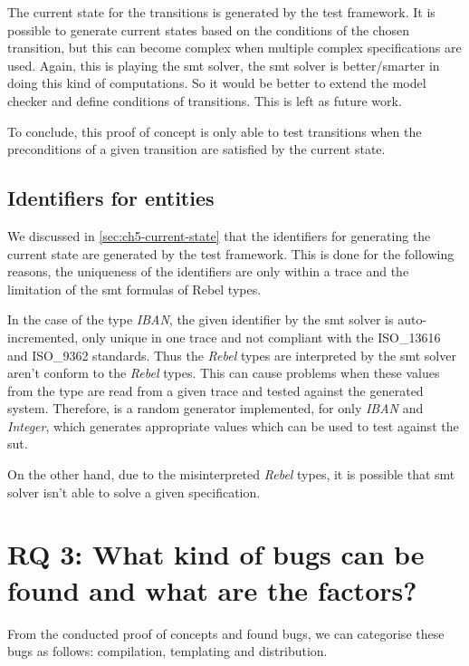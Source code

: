 The current state for the transitions is generated by the test framework. It is possible to generate current states based on the conditions of the chosen transition, but this can become complex when multiple complex specifications are used. Again, this is playing the \gls{smt} solver, the \gls{smt} solver is better/smarter in doing this kind of computations. So it would be better to extend the model checker and define conditions of transitions. This is left as future work.

To conclude, this proof of concept is only able to test transitions when the preconditions of a given transition are satisfied by the current state.


\subsection{Identifiers for entities}
We discussed in \autoref{sec:ch5-current-state} that the identifiers for generating the current state are generated by the test framework. This is done for the following reasons, the uniqueness of the identifiers are only within a trace and the limitation of the \gls{smt} formulas of Rebel types.

In the case of the type \textit{IBAN}, the given identifier by the \gls{smt} solver is auto-incremented, only unique in one trace and not compliant with the ISO\_13616 and ISO\_9362 standards. Thus the \textit{Rebel} types are interpreted by the \gls{smt} solver aren't conform to the \textit{Rebel} types. This can cause problems when these values from the type are read from a given trace and tested against the generated system. Therefore, is a random generator implemented, for only \textit{IBAN} and \textit{Integer}, which generates appropriate values which can be used to test against the \gls{sut}.

On the other hand, due to the misinterpreted \textit{Rebel} types, it is possible that \gls{smt} solver isn't able to solve a given specification.


\section{RQ 3: What kind of bugs can be found and what are the factors?}

From the conducted proof of concepts and found bugs, we can categorise these bugs as follows: compilation, templating and distribution.

